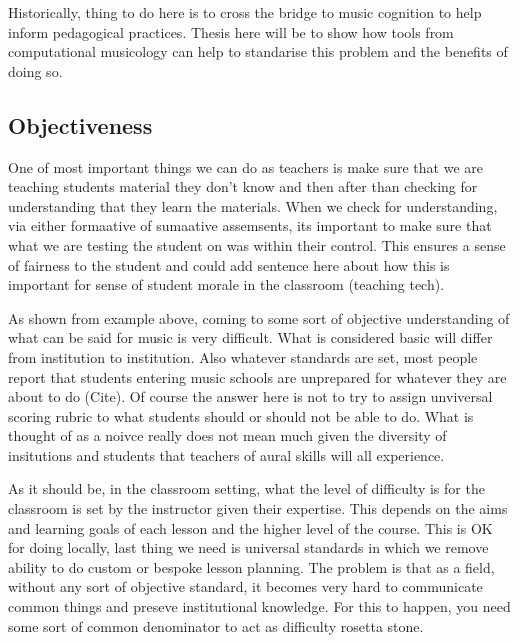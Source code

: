 \documentclass[english,man,floatsintext]{apa6}
\begin{document}
Historically, thing to do here is to cross the bridge to music cognition to help inform pedagogical practices.
Thesis here will be to show how tools from computational musicology can help to standarise this problem and the benefits of doing so.

\hypertarget{objectiveness}{%
\subsection{Objectiveness}\label{objectiveness}}

One of most important things we can do as teachers is make sure that we are teaching students material they don't know and then after than checking for understanding that they learn the materials.
When we check for understanding, via either formaative of sumaative assemsents, its important to make sure that what we are testing the student on was within their control.
This ensures a sense of fairness to the student and could add sentence here about how this is important for sense of student morale in the classroom (teaching tech).

As shown from example above, coming to some sort of objective understanding of what can be said for music is very difficult.
What is considered basic will differ from institution to institution.
Also whatever standards are set, most people report that students entering music schools are unprepared for whatever they are about to do (Cite).
Of course the answer here is not to try to assign unviversal scoring rubric to what students should or should not be able to do.
What is thought of as a noivce really does not mean much given the diversity of insitutions and students that teachers of aural skills will all experience.

As it should be, in the classroom setting, what the level of difficulty is for the classroom is set by the instructor given their expertise.
This depends on the aims and learning goals of each lesson and the higher level of the course.
This is OK for doing locally, last thing we need is universal standards in which we remove ability to do custom or bespoke lesson planning.
The problem is that as a field, without any sort of objective standard, it becomes very hard to communicate common things and preseve institutional knowledge.
For this to happen, you need some sort of common denominator to act as difficulty rosetta stone.
\end{document}

